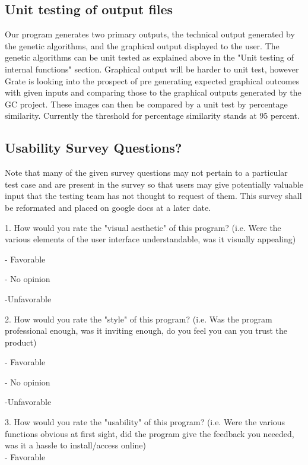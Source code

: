 \documentclass[12pt, titlepage]{article}
\begin{document}
\subsection{Unit testing of output files}		

Our program generates two primary outputs, the technical output generated by the genetic algorithms, and the graphical output displayed to the user. The genetic algorithms can be unit tested as explained above in the "Unit testing of internal functions" section. Graphical output will be harder to unit test, however Grate is looking into the prospect of pre generating expected graphical outcomes with given inputs and comparing those to the graphical outputs generated by the GC project. These images can then be compared by a unit test by percentage similarity. Currently the threshold for percentage similarity stands at 95 percent.





\newpage

\subsection{Usability Survey Questions?}

Note that many of the given survey questions may not pertain to a particular test case and are present in the survey so that users may give potentially valuable input that the testing team has not thought to request of them. This survey shall be reformated and placed on google docs at a later date.

1. How would you rate the "visual aesthetic" of this program? (i.e. Were the various elements of the user interface understandable, was it visually appealing)

- Favorable

- No opinion

-Unfavorable

2. How would you rate the "style" of this program? (i.e. Was the program professional enough, was it inviting enough,  do you feel you can you trust the product)

- Favorable

- No opinion

-Unfavorable

3. How would you rate the "usability" of this program? (i.e. Were the various functions obvious at first sight, did the program give the feedback you neeeded, was it a hassle to install/access online)\\
- Favorable
\end{document}

